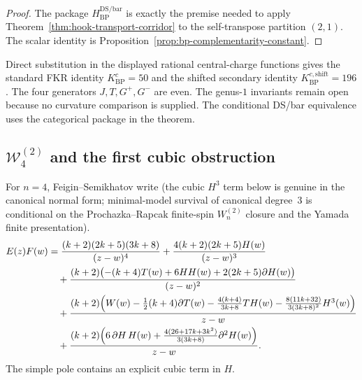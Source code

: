 \begin{proof}
The package $H_{\mathrm{BP}}^{\mathrm{DS/bar}}$ is exactly the premise
needed to apply Theorem~\ref{thm:hook-transport-corridor} to the
self-transpose partition $(2,1)$.  The scalar identity is
Proposition~\ref{prop:bp-complementarity-constant}.
\end{proof}

\begin{remark}
\label{rem:bp-self-dual-verification}
Direct substitution in the displayed rational central-charge functions gives
the standard FKR identity $K^c_{\mathrm{BP}}=50$ and the shifted secondary
identity $K^{c,\mathrm{shift}}_{\mathrm{BP}}=196$.  The four generators
\(J,T,G^+,G^-\) are even.  The genus-$1$ invariants remain open because no
curvature comparison is supplied.
The conditional DS/bar equivalence uses the categorical package in the
theorem.
\end{remark}

\subsection{\texorpdfstring{$\mathcal W_4^{(2)}$}{W4(2)} and the first cubic obstruction}

\begin{proposition}
\label{prop:w4-fs-normal-form-ope}
For $n=4$, Feigin--Semikhatov write
\cite[(A.4.2)]{FeiginSemikhatov} (the cubic $H^3$ term below is genuine
in the canonical normal form; minimal-model survival of canonical
degree~$3$ is conditional on the Prochazka--Rapcak finite-spin
$W_n^{(2)}$ closure and the Yamada finite presentation).
\begin{align}
E(z)F(w)
&=
\frac{(k+2)(2k+5)(3k+8)}{(z-w)^4}
+
\frac{4(k+2)(2k+5)H(w)}{(z-w)^3}
\notag\\
&\quad
+\frac{(k+2)\bigl(-(k+4)T(w)+6HH(w)+2(2k+5)\partial H(w)\bigr)}{(z-w)^2}
\notag\\
&\quad
+\frac{(k+2)\Bigl(
W(w)-\frac12(k+4)\partial T(w)
-\frac{4(k+4)}{3k+8}T H(w)
-\frac{8(11k+32)}{3(3k+8)^2}H^3(w)
\Bigr)}{z-w}
\notag\\
&\quad
+\frac{(k+2)\Bigl(
6\,\partial H\,H(w)
+\frac{4(26+17k+3k^2)}{3(3k+8)}\partial^2 H(w)
\Bigr)}{z-w}.
\label{eq:w4-ef}
\end{align}
The simple pole contains an explicit cubic term in $H$.
\end{proposition}

